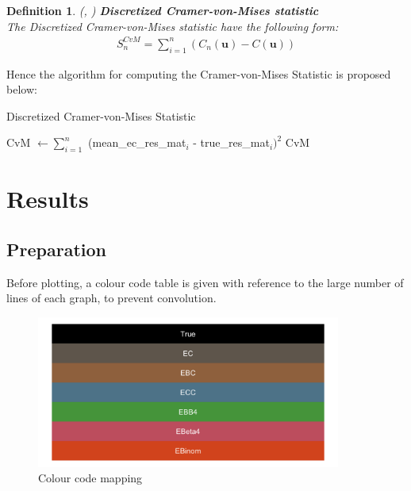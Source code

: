 \documentclass[12pt]{report}
\newtheorem{definition}{Definition}[subsection]
\newcommand{\1}{\mathbf{1}}
\begin{document}
\begin{flushleft}
\begin{definition}\label{CvMStatisticsDiscretized}
\textit{\normalfont(\cite{HofertBook}, \cite{GenestRemillardBeaudoinGOF2009})}\:
\textbf{Discretized Cramer-von-Mises statistic} \\
The Discretized Cramer-von-Mises statistic have the following form:
\begin{align*}
S_{n}^{CvM} = \sum\limits_{i = 1}^{n} (C_{n}(\textbf{u}) - C(\textbf{u}))
\end{align*}
\end{definition}
Hence the algorithm for computing the Cramer-von-Mises Statistic is proposed below:
\begin{algorithm}[H]
\caption{Discretized Cramer-von-Mises Statistic}
\begin{algorithmic}
    \State CvM $\gets \sum\limits_{i = 1}^{n}$ (mean\_ec\_res\_mat$_{i}$ - true\_res\_mat$_{i})^{2}$
    \State \Return CvM
\EndProcedure
\end{algorithmic}
\end{algorithm}

\newpage
\section{Results}
\vspace{0.5cm}
\subsection{Preparation}
\vspace{0.5cm}
Before plotting, a colour code table is given with reference to the large number of lines of each graph, to prevent convolution.\\

\begin{figure}[h!]
\centering
\includegraphics[width=10cm]{ColorPalette/ColorPalette.png}
\caption{Colour code mapping}
\end{figure}%


\end{flushleft}
\end{document}
